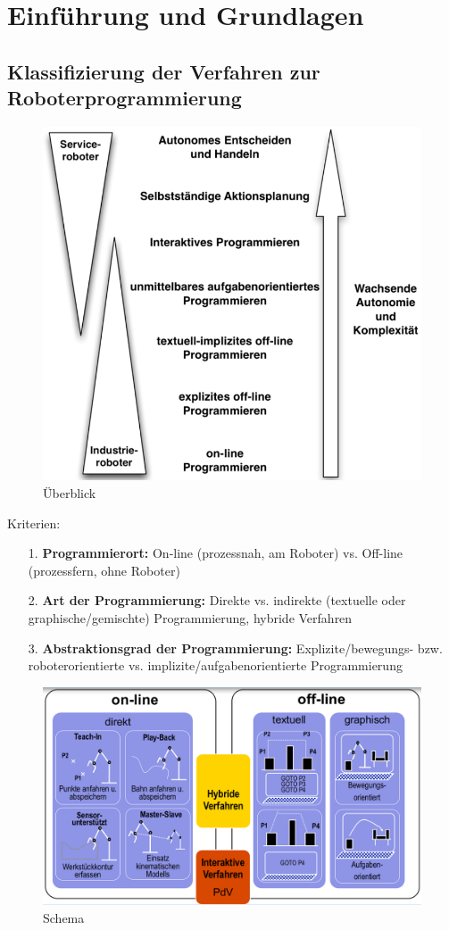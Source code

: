 \documentclass[11pt]{scrartcl}
\begin{document}
\section{Einführung und Grundlagen} %
\subsection{Klassifizierung der Verfahren zur Roboterprogrammierung}
\begin{figure}[ht]\centering 
\includegraphics[width=0.5\linewidth]{figures/ch01_ueberblick.png}
\caption{Überblick}
\label{fig:ch01_komp}
\end{figure}
Kriterien:
\begin{itemize}
\item[1.] \textbf{Programmierort:} On-line (prozessnah, am Roboter) vs. Off-line (prozessfern, ohne Roboter)
\item[2.] \textbf{Art der Programmierung:} Direkte vs. indirekte (textuelle oder graphische/gemischte) Programmierung, hybride Verfahren
\item[3.] \textbf{Abstraktionsgrad der Programmierung:} Explizite/bewegungs- bzw. roboterorientierte vs. implizite/aufgabenorientierte Programmierung
\end{itemize}
\begin{figure}[ht]\centering 
\includegraphics[width=\linewidth]{figures/ch01_schema.png}
\caption{Schema}
\label{fig:ch01_schema}
\end{figure}
\end{document}
